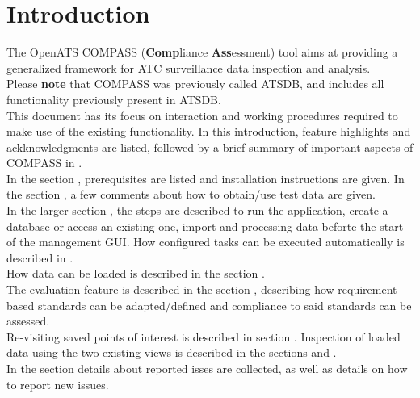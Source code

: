 \chapter{Introduction}

The OpenATS COMPASS (\textbf{Comp}liance \textbf{Ass}essment) tool aims at providing a generalized framework for ATC surveillance data inspection and analysis. \\

Please \textbf{note} that COMPASS was previously called ATSDB, and includes all functionality previously present in ATSDB. \\

This document has its focus on interaction and working procedures required to make use of the existing
functionality. In this introduction, feature highlights and ackknowledgments are listed, followed by a brief summary of important aspects of  COMPASS in . \\

In the section , prerequisites are listed and installation instructions are given. In the section , a few comments about how to obtain/use test data are given. \\

In the larger section , the steps are described to run the application, create a database or access an existing one, import and processing data beforte the start of the management GUI. How configured tasks can be executed automatically is described in . \\

How data can be loaded is described in the section . \\

The evaluation feature is described in the section , describing how requirement-based standards can be adapted/defined and compliance to said standards can be assessed. \\

Re-visiting saved points of interest is described in section . Inspection of loaded data using the two existing views is described in the sections  and . \\

In the section  details about reported isses are collected, as well as details on how to report new issues. \\

